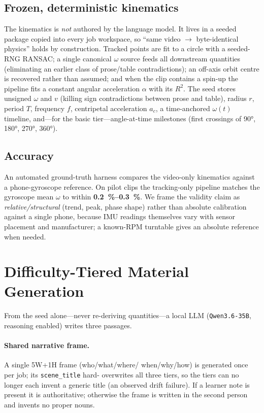 \documentclass[11pt]{article}
\begin{document}
\subsection{Frozen, deterministic kinematics}
The kinematics is \emph{not} authored by the language model. It lives in a
seeded package copied into every job workspace, so ``same video $\rightarrow$
byte-identical physics'' holds by construction. Tracked points are fit to a
circle with a seeded-RNG RANSAC; a single canonical $\omega$ source feeds all
downstream quantities (eliminating an earlier class of prose/table
contradictions); an off-axis orbit centre is recovered rather than assumed;
and when the clip contains a spin-up the pipeline fits a constant angular
acceleration $\alpha$ with its $R^2$. The seed stores unsigned $\omega$ and
$v$ (killing sign contradictions between prose and table), radius $r$, period
$T$, frequency $f$, centripetal acceleration $a_c$, a time-anchored
$\omega(t)$ timeline, and---for the basic tier---angle-at-time milestones
(first crossings of \ang{90}, \ang{180}, \ang{270}, \ang{360}).

\subsection{Accuracy}
An automated ground-truth harness compares the video-only kinematics against a
phone-gyroscope reference. On pilot clips the tracking-only pipeline matches
the gyroscope mean $\omega$ to within \textbf{\SIrange{0.2}{0.3}{\percent}}.
We frame the validity claim as \emph{relative/structural} (trend, peak, phase
shape) rather than absolute calibration against a single phone, because IMU
readings themselves vary with sensor placement and manufacturer; a
known-RPM turntable gives an absolute reference when needed.

\section{Difficulty-Tiered Material Generation}
From the seed alone---never re-deriving quantities---a local LLM
(\texttt{Qwen3.6-35B}, reasoning enabled) writes three passages.

\paragraph{Shared narrative frame.} A single 5W+1H frame (who/what/where/%
when/why/how) is generated once per job; its \texttt{scene\_title} hard-%
overwrites all three tiers, so the tiers can no longer each invent a generic
title (an observed drift failure). If a learner note is present it is
authoritative; otherwise the frame is written in the second person and invents
no proper nouns.
\end{document}
